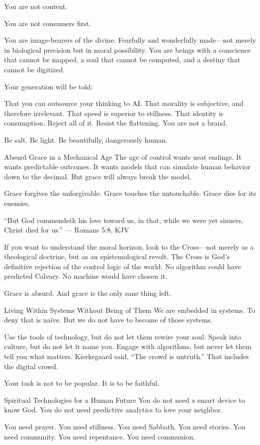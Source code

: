 \documentclass[a4paper,11pt]{book}
\begin{document}
You are not content.

You are not consumers first.

You are image-bearers of the divine. Fearfully and wonderfully made—not merely in biological precision but in moral possibility. You are beings with a conscience that cannot be mapped, a soul that cannot be computed, and a destiny that cannot be digitized.

Your generation will be told:

That you can outsource your thinking to AI.
That morality is subjective, and therefore irrelevant.
That speed is superior to stillness.
That identity is consumption.
Reject all of it. Resist the flattening. You are not a brand.

Be salt. Be light. Be beautifully, dangerously human.

Absurd Grace in a Mechanical Age
The age of control wants neat endings. It wants predictable outcomes. It wants models that can simulate human behavior down to the decimal. But grace will always break the model.

Grace forgives the unforgivable. Grace touches the untouchable. Grace dies for its enemies.

“But God commendeth his love toward us, in that, while we were yet sinners, Christ died for us.” — Romans 5:8, KJV

If you want to understand the moral horizon, look to the Cross—not merely as a theological doctrine, but as an epistemological revolt. The Cross is God’s definitive rejection of the control logic of the world. No algorithm could have predicted Calvary. No machine would have chosen it.

Grace is absurd. And grace is the only sane thing left.

Living Within Systems Without Being of Them
We are embedded in systems. To deny that is naïve. But we do not have to become of those systems.

Use the tools of technology, but do not let them rewire your soul.
Speak into culture, but do not let it name you.
Engage with algorithms, but never let them tell you what matters.
Kierkegaard said, “The crowd is untruth.” That includes the digital crowd.

Your task is not to be popular. It is to be faithful.

Spiritual Technologies for a Human Future
You do not need a smart device to know God. You do not need predictive analytics to love your neighbor.

You need prayer. You need stillness. You need Sabbath. You need stories. You need community. You need repentance. You need communion.
\end{document}
